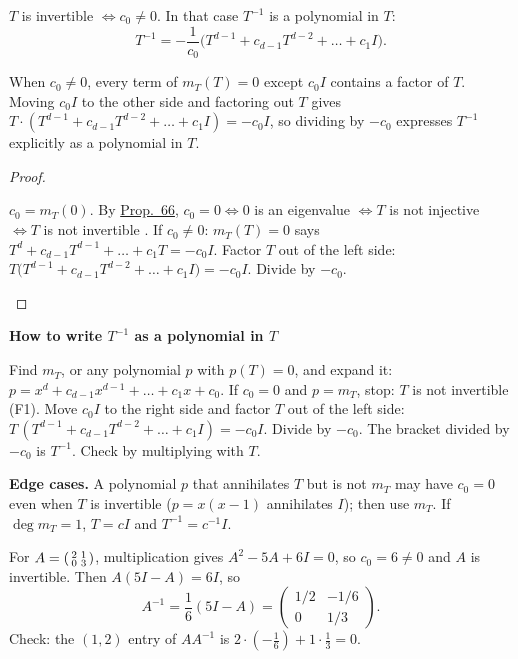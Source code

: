 \documentclass[10pt]{scrartcl}
\newenvironment{methodbox}[1]{\begin{mdframed}[style=mdbluebox,linecolor=NavyBlue,backgroundcolor=NavyBlue!3]\textbf{\color{NavyBlue}#1}\par\vspace{2pt}}{\end{mdframed}}
\begin{document}
\begin{proposition*}\hypertarget{name-f1-invertibility-hw7-p3}{}\label{name-f1-invertibility-hw7-p3}
  $T$ is invertible $\iff c_0\ne0$. In that case $T^{-1}$ is a polynomial in $T$:
  \[ T^{-1}=-\frac1{c_0}\bigl(T^{d-1}+c_{d-1}T^{d-2}+\dots+c_1I\bigr). \]
\end{proposition*}
\begin{ideabox}
When $c_0\ne 0$, every term of $m_T(T)=0$ except $c_0I$ contains a factor of $T$. Moving $c_0I$ to the other side and factoring out $T$ gives $T\cdot(T^{d-1}+c_{d-1}T^{d-2}+\dots+c_1I)=-c_0I$, so dividing by $-c_0$ expresses $T^{-1}$ explicitly as a polynomial in $T$.
\end{ideabox}
\begin{proof}
  \begin{steps}
    \ii $c_0=m_T(0)$. By \hyperref[prop-66]{Prop.~66}, $c_0=0\iff0$ is an eigenvalue $\iff T$ is not injective  $\iff T$ is not invertible .
    \ii If $c_0\ne0$: $m_T(T)=0$ says $T^d+c_{d-1}T^{d-1}+\dots+c_1T=-c_0I$.
    \ii Factor $T$ out of the left side: $T\bigl(T^{d-1}+c_{d-1}T^{d-2}+\dots+c_1I\bigr)=-c_0I$. Divide by $-c_0$.
  \end{steps}
\end{proof}

\begin{methodbox}{How to write $T^{-1}$ as a polynomial in $T$}
\begin{enumerate}[label=\arabic*.,leftmargin=1.5em,itemsep=2pt,topsep=2pt]
  \ii Find $m_T$, or any polynomial $p$ with $p(T)=0$, and expand it: $p=x^d+c_{d-1}x^{d-1}+\dots+c_1x+c_0$.
  \ii If $c_0=0$ and $p=m_T$, stop: $T$ is not invertible (F1).
  \ii Move $c_0I$ to the right side and factor $T$ out of the left side: $T\,(T^{d-1}+c_{d-1}T^{d-2}+\dots+c_1I)=-c_0I$.
  \ii Divide by $-c_0$. The bracket divided by $-c_0$ is $T^{-1}$. Check by multiplying with $T$.
\end{enumerate}
\textbf{Edge cases.} A polynomial $p$ that annihilates $T$ but is not $m_T$ may have $c_0=0$ even when $T$ is invertible ($p=x(x-1)$ annihilates $I$); then use $m_T$. If $\deg m_T=1$, $T=cI$ and $T^{-1}=c^{-1}I$.
\end{methodbox}

\begin{example*}
  For $A=\begin{psmallmatrix}2&1\\0&3\end{psmallmatrix}$, multiplication gives $A^2-5A+6I=0$, so $c_0=6\ne0$ and $A$ is invertible. Then $A(5I-A)=6I$, so
  \[ A^{-1}=\frac16(5I-A)=\begin{pmatrix}1/2&-1/6\\0&1/3\end{pmatrix}. \]
  Check: the $(1,2)$ entry of $AA^{-1}$ is $2\cdot(-\frac16)+1\cdot\frac13=0$.
\end{example*}
\end{document}
